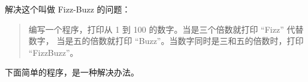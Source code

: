 \begin{Exercise}[title={FizzBuzz},difficulty=1]
\label{ex:fizzbuzz}
\Question \label{ex:fizzbuzz q1} 解决这个叫做 Fizz-Buzz \cite{fizzbuzz} 的问题：
\begin{quote}
编写一个程序，打印从 1 到 100 的数字。当是三个倍数就打印 ``Fizz'' 代替数字，
当是五的倍数就打印 ``Buzz''。当数字同时是三和五的倍数时，打印 ``FizzBuzz''。
\end{quote}
\end{Exercise}

\begin{Answer}
\Question 下面简单的程序，是一种解决办法。

\showremarks
\end{Answer}
